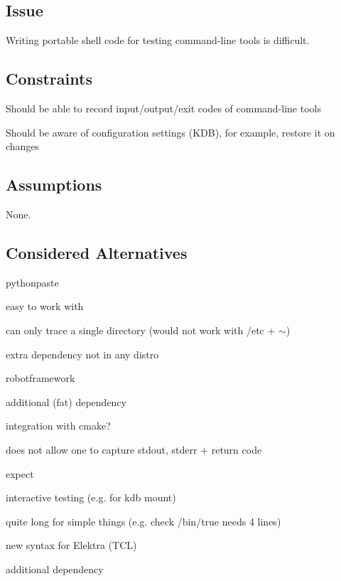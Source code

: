 \subsection*{Issue}

Writing portable shell code for testing command-\/line tools is difficult.

\subsection*{Constraints}


\begin{DoxyItemize}
\item Should be able to record input/output/exit codes of command-\/line tools
\item Should be aware of configuration settings (K\+DB), for example, restore it on changes
\end{DoxyItemize}

\subsection*{Assumptions}

None.

\subsection*{Considered Alternatives}


\begin{DoxyItemize}
\item pythonpaste
\begin{DoxyItemize}
\item easy to work with
\item can only trace a single directory (would not work with /etc + $\sim$)
\item extra dependency not in any distro
\end{DoxyItemize}
\item robotframework
\begin{DoxyItemize}
\item additional (fat) dependency
\item integration with cmake?
\item does not allow one to capture stdout, stderr + return code
\end{DoxyItemize}
\item expect
\begin{DoxyItemize}
\item interactive testing (e.\+g. for kdb mount)
\item quite long for simple things (e.\+g. check /bin/true needs 4 lines)
\item new syntax for Elektra (T\+CL)
\item additional dependency
\end{DoxyItemize}
\end{DoxyItemize}

